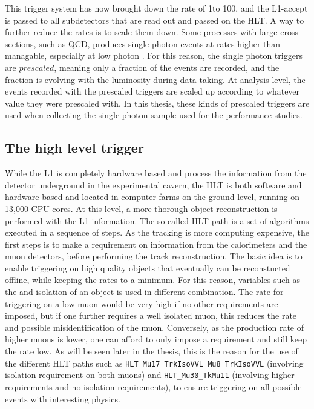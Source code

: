 This trigger system has now brought down the rate of 1\GHz to 100\kHz, and the L1-accept is passed to all subdetectors that are read out and passed on the HLT.
\newpara
\noindent\justify
A way to further reduce the rates is to scale them down. 
Some processes with large cross sections, such as QCD, produces single photon events at rates higher than managable, especially at low photon \pt. 
For this reason, the single photon triggers are $prescaled$, meaning only a fraction of the events are recorded, and the fraction is evolving with the luminosity during data-taking. 
At analysis level, the events recorded with the prescaled triggers are scaled up according to whatever value they were prescaled with. 
In this thesis, these kinds of prescaled triggers are used when collecting the single photon sample used for the \ptmiss performance studies.  
\subsection*{The high level trigger}
\noindent\justify
While the L1 is completely hardware based and process the information from the detector underground in the experimental cavern, the HLT is both software and hardware based and located in computer farms on the ground level, running on 13,000 CPU cores. 
At this level, a more thorough object reconstruction is performed with the L1 information. The so called HLT path is a set of algorithms executed in a sequence of steps. 
As the tracking is more computing expensive, the first steps is to make a requirement on information from the calorimeters and the muon detectors, before performing the track reconstruction. 
\newpara
\noindent\justify
The basic idea is to enable triggering on high quality objects that eventually can be reconstucted offline, while keeping the rates to a minimum. 
For this reason, variables such as the \pt and isolation of an object is used in different combination. 
The rate for triggering on a low \pt muon would be very high if no other requirements are imposed, but if one further requires a well isolated muon, this reduces the rate and possible misidentification of the muon. 
Conversely, as the production rate of higher \pt muons is lower, one can afford to only impose a \pt requirement and still keep the rate low.   
As will be seen later in the thesis, this is the reason for the use of the different HLT paths such as \texttt{HLT\_Mu17\_TrkIsoVVL\_Mu8\_TrkIsoVVL} (involving isolation requirement on both muons) and \texttt{HLT\_Mu30\_TkMu11} (involving higher \pt requirements and no isolation requirements), to ensure triggering on all possible events with interesting physics.
